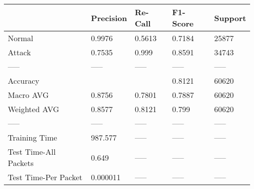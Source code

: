 \begin{tabular}{lllll}
\toprule
{} & Precision & Re-Call & F1-Score & Support \\
\midrule
Normal                &    0.9976 &  0.5613 &   0.7184 &   25877 \\
Attack                &    0.7535 &   0.999 &   0.8591 &   34743 \\
-----                 &     ----- &   ----- &    ----- &   ----- \\
Accuracy              &           &         &   0.8121 &   60620 \\
Macro AVG             &    0.8756 &  0.7801 &   0.7887 &   60620 \\
Weighted AVG          &    0.8577 &  0.8121 &    0.799 &   60620 \\
-----                 &     ----- &   ----- &    ----- &   ----- \\
Training Time         &   987.577 &   ----- &    ----- &   ----- \\
Test Time-All Packets &     0.649 &   ----- &    ----- &   ----- \\
Test Time-Per Packet  &  0.000011 &   ----- &    ----- &   ----- \\
\bottomrule
\end{tabular}
